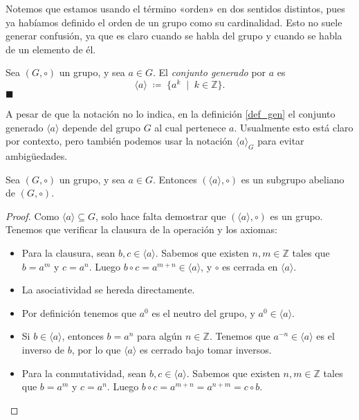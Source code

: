 Notemos que estamos usando el término «orden» en dos sentidos distintos, pues ya habíamos definido el orden de un grupo como su cardinalidad. Esto no suele generar confusión, ya que es claro cuando se habla del grupo y cuando se habla de un elemento de él. 
 
\begin{definition}\label{def_gen}
	Sea $(G,\circ)$ un grupo, y sea $a \in G$.
	El \emph{conjunto generado} por $a$ es
	$$\langle a \rangle \; \coloneq \; \{a^k\; \mid \; k\in\mathbb{Z}\}.$$
    \hfill$\blacksquare$
\end{definition}

A pesar de que la notación no lo indica, en la definición \ref{def_gen} el conjunto generado $\langle a \rangle$ depende del grupo $G$ al cual pertenece $a$. Usualmente esto está claro por contexto, pero también podemos usar la notación $\langle a \rangle_{G}$ para evitar ambigüedades.


\begin{proposition}\label{prop-generado}
	Sea $(G,\circ)$ un grupo, y sea $a \in G$. Entonces $(\langle a\rangle , \circ)$ es un subgrupo abeliano de $(G,\circ)$. 
\end{proposition} 


\begin{proof}
Como $\langle a\rangle\subseteq G$, solo hace falta demostrar
que $(\langle a\rangle,\circ)$ es un grupo. Tenemos que verificar la clausura de la operación y los axiomas:
\begin{itemize}
\item Para la clausura, sean $b,c \in \langle
a\rangle$. Sabemos que existen $n, m \in \mathbb{Z}$ tales que $b = a^m$ y $c = a^n$. Luego $b \circ c = a^{m+n} \in \langle a\rangle$, y $\circ$ es cerrada en $\langle a \rangle$.
\item La asociatividad se hereda directamente.
\item Por definición tenemos que $a^0$ es el neutro del grupo, y $a^0 \in \langle a \rangle$. 
\item Si $b \in \langle a \rangle$, entonces $b = a^n$ para algún $n \in \mathbb{Z}$. Tenemos que $a^{-n} \in \langle a \rangle$ es el inverso de $b$, por lo que $\langle a \rangle$ es cerrado bajo tomar inversos.
\item Para la conmutatividad, sean $b,c \in \langle
	a\rangle$. Sabemos que existen $n, m \in \mathbb{Z}$ tales que $b = a^m$ y $c = a^n$. Luego $b \circ c = a^{m + n} = a^{n + m} = c \circ b$.
\end{itemize}
\end{proof}

